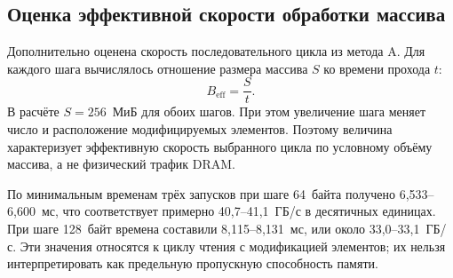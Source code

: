 \subsection{Оценка эффективной скорости обработки массива}

Дополнительно оценена скорость последовательного цикла из метода A. Для каждого шага вычислялось отношение размера массива $S$ ко времени прохода $t$:
\[
  B_{\mathrm{eff}} = \frac{S}{t}.
\]
В расчёте $S=256$~МиБ для обоих шагов. При этом увеличение шага меняет число и расположение модифицируемых элементов. Поэтому величина характеризует эффективную скорость выбранного цикла по условному объёму массива, а не физический трафик DRAM.

По минимальным временам трёх запусков при шаге 64~байта получено 6,533--6,600~мс, что соответствует примерно 40,7--41,1~ГБ/с в десятичных единицах. При шаге 128~байт времена составили 8,115--8,131~мс, или около 33,0--33,1~ГБ/с. Эти значения относятся к циклу чтения с модификацией элементов; их нельзя интерпретировать как предельную пропускную способность памяти.
